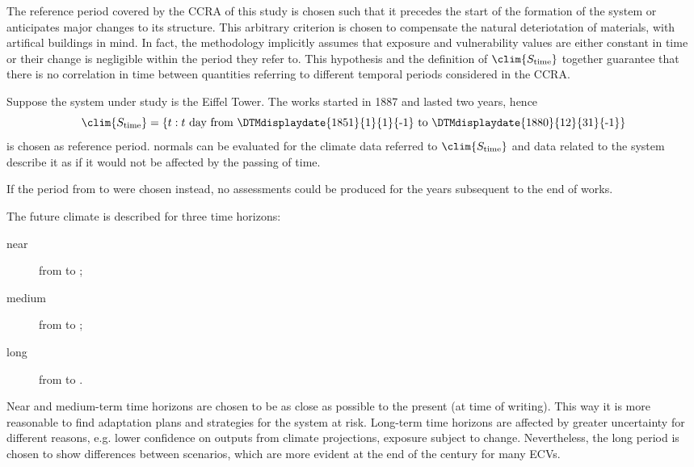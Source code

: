 The reference period covered by the \gls{CCRA} of this study is chosen such that it precedes the start of the formation of the system or anticipates major changes to its structure. This arbitrary criterion is chosen to compensate the natural deteriotation of materials, with artifical buildings in mind. In fact, the methodology implicitly assumes that exposure and vulnerability values are either constant in time or their change is negligible within the period they refer to. This hypothesis and the definition of $\clim{S_\text{time}}$ together guarantee that there is no correlation in time between quantities referring to different temporal periods considered in the \gls{CCRA}.
\begin{example}
  Suppose the system under study is the Eiffel Tower. The works started in 1887 and lasted two years, hence
  \begin{equation*}
    \clim{S_\text{time}} = \{ t : \text{$t$ day from \DTMdisplaydate{1851}{1}{1}{-1} to \DTMdisplaydate{1880}{12}{31}{-1}} \}
  \end{equation*}
  is chosen as reference period. \Glspl{normal} can be evaluated for the climate data referred to $\clim{S_\text{time}}$ and data related to the system describe it as if it would not be affected by the passing of time.
  
  If the period from  to  were chosen instead, no assessments could be produced for the years subsequent to the end of works.
\end{example}

The future climate is described for three time horizons:
\begin{description}
  \item[near] from  to ;
  \item[medium] from  to ;
  \item[long] from  to .
\end{description}
Near and medium-term time horizons are chosen to be as close as possible to the present (at time of writing). This way it is more reasonable to find adaptation plans and strategies for the system at risk.
Long-term time horizons are affected by greater uncertainty for different reasons, e.g. lower confidence on outputs from climate projections, exposure subject to change. Nevertheless, the long period is chosen to show differences between scenarios, which are more evident at the end of the century for many \glspl{ECV}.



